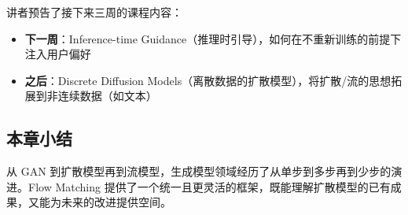 讲者预告了接下来三周的课程内容：
\begin{itemize}
    \item \textbf{下一周}：Inference-time Guidance（推理时引导），如何在不重新训练的前提下注入用户偏好
    \item \textbf{之后}：Discrete Diffusion Models（离散数据的扩散模型），将扩散/流的思想拓展到非连续数据（如文本）
\end{itemize}

\subsection{本章小结}

从 GAN 到扩散模型再到流模型，生成模型领域经历了从单步到多步再到少步的演进。Flow Matching 提供了一个统一且更灵活的框架，既能理解扩散模型的已有成果，又能为未来的改进提供空间。

